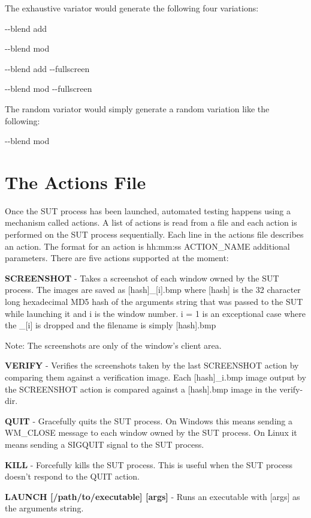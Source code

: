 The exhaustive variator would generate the following four variations\-:\par
 {\ttfamily  -\/-\/blend add \par
 -\/-\/blend mod \par
 -\/-\/blend add -\/-\/fullscreen \par
 -\/-\/blend mod -\/-\/fullscreen \par
 }

The random variator would simply generate a random variation like the following\-:\par
 {\ttfamily -\/-\/blend mod}\hypertarget{index_actionconfig_sec}{}\section{The Actions File}\label{index_actionconfig_sec}
Once the S\-U\-T process has been launched, automated testing happens using a mechanism called actions. A list of actions is read from a file and each action is performed on the S\-U\-T process sequentially. Each line in the actions file describes an action. The format for an action is {\ttfamily hh\-:mm\-:ss A\-C\-T\-I\-O\-N\-\_\-\-N\-A\-M\-E additional parameters}. There are five actions supported at the moment\-: \begin{DoxyItemize}
\item {\bfseries S\-C\-R\-E\-E\-N\-S\-H\-O\-T} -\/ Takes a screenshot of each window owned by the S\-U\-T process. The images are saved as {\ttfamily }\mbox{[}hash\mbox{]}\-\_\-\mbox{[}i\mbox{]}.bmp where {\ttfamily }\mbox{[}hash\mbox{]} is the 32 character long hexadecimal M\-D5 hash of the arguments string that was passed to the S\-U\-T while launching it and {\ttfamily i} is the window number. i = 1 is an exceptional case where the {\ttfamily \-\_\-}\mbox{[}i\mbox{]} is dropped and the filename is simply {\ttfamily }\mbox{[}hash\mbox{]}.bmp\par
 Note\-: The screenshots are only of the window's client area. \item {\bfseries V\-E\-R\-I\-F\-Y} -\/ Verifies the screenshots taken by the last S\-C\-R\-E\-E\-N\-S\-H\-O\-T action by comparing them against a verification image. Each {\ttfamily }\mbox{[}hash\mbox{]}\-\_\-i.\-bmp image output by the S\-C\-R\-E\-E\-N\-S\-H\-O\-T action is compared against a {\ttfamily }\mbox{[}hash\mbox{]}.bmp image in the verify-\/dir. \item {\bfseries Q\-U\-I\-T} -\/ Gracefully quits the S\-U\-T process. On Windows this means sending a W\-M\-\_\-\-C\-L\-O\-S\-E message to each window owned by the S\-U\-T process. On Linux it means sending a S\-I\-G\-Q\-U\-I\-T signal to the S\-U\-T process. \item {\bfseries K\-I\-L\-L} -\/ Forcefully kills the S\-U\-T process. This is useful when the S\-U\-T process doesn't respond to the Q\-U\-I\-T action. \item {\bfseries L\-A\-U\-N\-C\-H \mbox{[}/path/to/executable\mbox{]} \mbox{[}args\mbox{]}} -\/ Runs an executable with {\ttfamily }\mbox{[}args\mbox{]} as the arguments string.\end{DoxyItemize}
